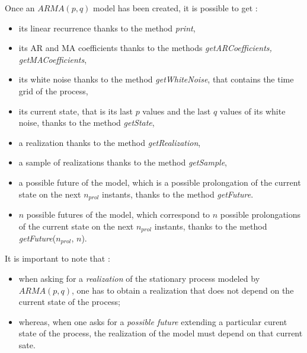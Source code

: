 \renewcommand{\filename}{docUC_StocProc_ARMA_Manipulation.tex}
\renewcommand{\filetitle}{UC : Manipulation of an ARMA process}

\HeaderIIILevel

\label{ARMAManipulation}


Once an $ARMA(p,q)$ model has been created, it is possible to get :
\begin{itemize}
\item  its linear recurrence thanks to the method \emph{print},
\item  its AR and MA coefficients thanks to the methods \emph{getARCoefficients, getMACoefficients},
\item  its white noise thanks to the method \emph{getWhiteNoise}, that contains the time grid of the process,
\item  its current state, that is its last $p$ values and the last $q$ values of its white noise,  thanks to the method \emph{getState},
\item   a realization thanks to the method \emph{getRealization},
\item  a sample of realizations thanks to the method \emph{getSample},
\item  a possible future of the model, which is a possible prolongation of the current state on the next $n_{prol}$ instants, thanks to the method \emph{getFuture}.
\item   $n$ possible futures of the model, which correspond to  $n$ possible prolongations of the current state on the next $n_{prol}$ instants, thanks to the method \emph{getFuture}($n_{prol}$, $n$).
\end{itemize}


It is important to note that :
\begin{itemize}
\item when asking for a \emph{realization} of the stationary process modeled by $ARMA(p,q)$, one has to obtain a realization that does not depend on the current state of the process;
\item whereas, when one asks for a \emph{possible future} extending a particular curent state of the process, the realization of the model must depend on that current sate.
\end{itemize}

